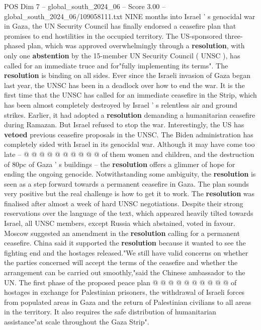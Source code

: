 \begin{textsample}{POS Dim 7 – global\_south\_2024\_06 – Score 3.00 – global\_south\_2024\_06/109058111.txt}  \label{ex:f7_pos_081}
NINE months into Israel ' s genocidal war in Gaza, the UN Security Council has finally endorsed a ceasefire plan that promises to end hostilities in the occupied territory.
The US-sponsored three-phased plan, which was approved overwhelmingly through a \textbf{resolution}, with only one \textbf{abstention} by the 15-member UN Security Council ( UNSC ), has called for an immediate truce and for"fully implementing its terms".
The \textbf{resolution} is binding on all sides.
Ever since the Israeli invasion of Gaza began last year, the UNSC has been in a deadlock over how to end the war.
It is the first time that the UNSC has called for an immediate ceasefire in the Strip, which has been almost completely destroyed by Israel ' s relentless air and ground strikes.
Earlier, it had adopted a \textbf{resolution} demanding a humanitarian ceasefire during Ramazan.
But Israel refused to stop the war.
Interestingly, the US has \textbf{vetoed} previous ceasefire proposals in the UNSC.
The Biden administration has completely sided with Israel in its genocidal war.
Although it may have come too late -- @ @ @ @ @ @ @ @ @ @ of them women and children, and the destruction of 80pc of Gaza ' s buildings -- the \textbf{resolution} offers a glimmer of hope for ending the ongoing genocide.
Notwithstanding some ambiguity, the \textbf{resolution} is seen as a step forward towards a permanent ceasefire in Gaza.
The plan sounds very positive but the real challenge is how to get it to work.
The \textbf{resolution} was finalised after almost a week of hard UNSC negotiations.
Despite their strong reservations over the language of the text, which appeared heavily tilted towards Israel, all UNSC members, except Russia which abstained, voted in favour.
Moscow suggested an amendment in the \textbf{resolution} calling for a permanent ceasefire.
China said it supported the \textbf{resolution} because it wanted to see the fighting end and the hostages released."We still have valid concerns on whether the parties concerned will accept the terms of the ceasefire and whether the arrangement can be carried out smoothly,"said the Chinese ambassador to the UN.
The first phase of the proposed peace plan @ @ @ @ @ @ @ @ @ @ of hostages in exchange for Palestinian prisoners, the withdrawal of Israeli forces from populated areas in Gaza and the return of Palestinian civilians to all areas in the territory.
It also requires the safe distribution of humanitarian assistance"at scale throughout the Gaza Strip".

\end{textsample}
